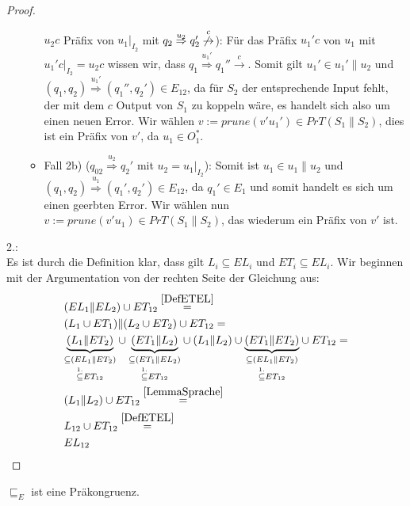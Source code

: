 \begin{proof}
\begin{itemize}
\begin{itemize}
        $u_2c$ Präfix von $u_1|_{I_2}$ mit $q_2 \overset{u_2}{\Rightarrow} q_2'
        \overset{c}{\not{\hspace{-0.1cm}\rightarrow}}$): Für das Präfix $u_1'c$
        von $u_1$ mit $u_1'c|_{I_2}=u_2c$ wissen wir, dass $q_1
        \overset{u_1'}{\Rightarrow} q_1'' \overset{c}{\rightarrow}$. Somit gilt
        $u_1'\in u_1'\|u_2$ und $(q_1,q_2) \overset{u_1'}{\Rightarrow}
        (q_1'',q_2')\in E_{12}$, da für $S_2$ der entsprechende Input fehlt,
        der mit dem $c$ Output von $S_1$ zu koppeln wäre, es handelt sich also
        um einen neuen Error. Wir wählen $v:=prune(v'u_1')\in PrT(S_1\| S_2)$,
        dies ist ein Präfix von $v'$, da $u_1\in O_1^*$.
      \item Fall 2b) ($q_{02} \overset{u_2}{\Rightarrow} q_2'$ mit
        $u_2=u_1|_{I_2}$): Somit ist $u_1\in u_1\|u_2$ und $(q_1,q_2)
        \overset{u_1}{\Rightarrow} (q_1',q_2')\in E_{12}$, da $q_1'\in E_1$ und
        somit handelt es sich um einen geerbten Error. Wir wählen nun $v:=prune
        (v'u_1)\in PrT(S_1\|S_2)$, das wiederum ein Präfix von $v'$ ist.
    \end{itemize}
  \end{itemize}

  2.:\\
  Es ist durch die Definition klar, dass gilt $L_i\subseteq EL_i$ und
  $ET_i\subseteq EL_i$. Wir beginnen mit der Argumentation von der rechten
  Seite der Gleichung aus:
  \begin{align*}
    &(EL_1\| EL_2)\cup ET_{12}\overset{\ref{DefETEL}}{=}\\
    &(L_1\cup ET_1)\|(L_2\cup ET_2)\cup ET_{12}=\\
    &\underset{\overset{1.}{\subseteq} ET_{12}}{\underset{\subseteq
    (EL_1\|ET_2)}{\underbrace{(L_1\|ET_2)}}} \cup
    \underset{\overset{1.}{\subseteq} ET_{12}}{\underset{\subseteq
    (ET_1\|EL_2)}{\underbrace{(ET_1\|L_2)}}} \cup
    (L_1\|L_2) \cup \underset{\overset{1.}{\subseteq}
    ET_{12}}{\underset{\subseteq (EL_1\|ET_2)}{\underbrace{(ET_1\|ET_2)}}} \cup
    ET_{12}=\\
    &(L_1\|L_2) \cup ET_{12}\overset{\ref{LemmaSprache}}{=}\\
    &L_{12}\cup ET_{12}\overset{\ref{DefETEL}}{=}\\
    &EL_{12}
  \end{align*}
\end{proof}

\begin{prop}[Präkongruenz]
  \label{korPraekongruenz}
  $\sqsubseteq _E$ ist eine Präkongruenz.
\end{prop}

